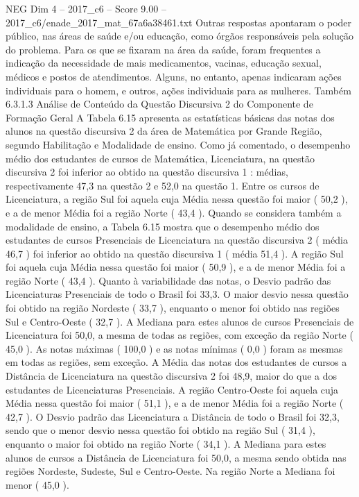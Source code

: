 \begin{textsample}{NEG Dim 4 – 2017\_c6 – Score 9.00 – 2017\_c6/enade\_2017\_mat\_67a6a38461.txt}
Outras respostas apontaram o poder público, nas áreas de saúde e/ou educação, como órgãos responsáveis pela solução do problema.
Para os que se fixaram na área da saúde, foram frequentes a indicação da necessidade de mais medicamentos, vacinas, educação sexual, médicos e postos de atendimentos.
Alguns, no entanto, apenas indicaram ações individuais para o homem, e outros, ações individuais para as mulheres.
Também 6.3.1.3 Análise de Conteúdo da Questão Discursiva 2 do Componente de Formação Geral A Tabela 6.15 apresenta as estatísticas básicas das notas dos alunos na questão discursiva 2 da área de Matemática por Grande Região, segundo Habilitação e Modalidade de ensino.
Como já comentado, o desempenho médio dos estudantes de cursos de Matemática, Licenciatura, na questão discursiva 2 foi inferior ao obtido na questão discursiva 1 : médias, respectivamente 47,3 na questão 2 e 52,0 na questão 1.
Entre os cursos de Licenciatura, a região Sul foi aquela cuja Média nessa questão foi maior ( 50,2 ), e a de menor Média foi a região Norte ( 43,4 ).
Quando se considera também a modalidade de ensino, a Tabela 6.15 mostra que o desempenho médio dos estudantes de cursos Presenciais de Licenciatura na questão discursiva 2 ( média 46,7 ) foi inferior ao obtido na questão discursiva 1 ( média 51,4 ).
A região Sul foi aquela cuja Média nessa questão foi maior ( 50,9 ), e a de menor Média foi a região Norte ( 43,4 ).
Quanto à variabilidade das notas, o Desvio padrão das Licenciaturas Presenciais de todo o Brasil foi 33,3.
O maior desvio nessa questão foi obtido na região Nordeste ( 33,7 ), enquanto o menor foi obtido nas regiões Sul e Centro-Oeste ( 32,7 ).
A Mediana para estes alunos de cursos Presenciais de Licenciatura foi 50,0, a mesma de todas as regiões, com exceção da região Norte ( 45,0 ).
As notas máximas ( 100,0 ) e as notas mínimas ( 0,0 ) foram as mesmas em todas as regiões, sem exceção.
A Média das notas dos estudantes de cursos a Distância de Licenciatura na questão discursiva 2 foi 48,9, maior do que a dos estudantes de Licenciaturas Presenciais.
A região Centro-Oeste foi aquela cuja Média nessa questão foi maior ( 51,1 ), e a de menor Média foi a região Norte ( 42,7 ).
O Desvio padrão das Licenciatura a Distância de todo o Brasil foi 32,3, sendo que o menor desvio nessa questão foi obtido na região Sul ( 31,4 ), enquanto o maior foi obtido na região Norte ( 34,1 ).
A Mediana para estes alunos de cursos a Distância de Licenciatura foi 50,0, a mesma sendo obtida nas regiões Nordeste, Sudeste, Sul e Centro-Oeste.
Na região Norte a Mediana foi menor ( 45,0 ).

\end{textsample}
